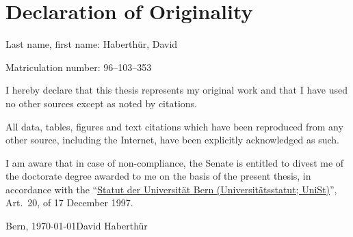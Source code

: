 \pagestyle{empty}
\hfill
\vfill
\section*{Declaration of Originality}
\noindent Last name, first name: Haberthür, David\bigskip

\noindent Matriculation number: 96--103--353\bigskip



I hereby declare that this thesis represents my original work and that I have used no other sources except as noted by citations.

All data, tables, figures and text citations which have been reproduced from any other source, including the Internet, have been explicitly acknowledged as such.

I am aware that in case of non-compliance, the Senate is entitled to divest me of the doctorate degree awarded to me on the basis of the present thesis, in accordance with the
``\href{http://www.sta.be.ch/belex/d/4/436_111_2.html}{Statut der Universität Bern (Universitätsstatut; UniSt)}'', Art.\ 20, of 17 December 1997.\bigskip
 
\noindent Bern, \today \hfill David Haberthür%
